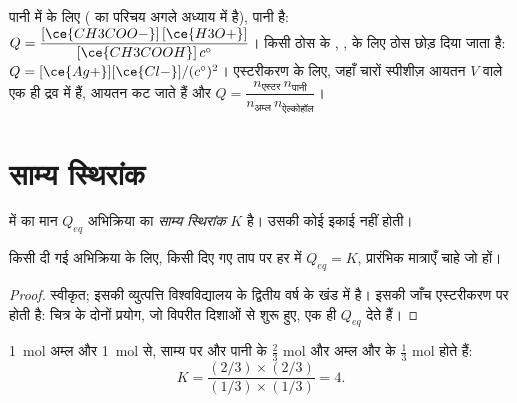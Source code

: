 \begin{example}[भागफल लिखना]\label{ex:g12:equilibrium:quotients}
पानी में  के लिए ( 
का परिचय अगले अध्याय में है), पानी  है:
$Q = \dfrac{[\ce{CH3COO-}]\,[\ce{H3O+}]}{[\ce{CH3COOH}]\,c^\circ}$। किसी ठोस के
, , के लिए ठोस छोड़ दिया जाता है:
$Q = [\ce{Ag+}][\ce{Cl-}]/(c^\circ)^2$। एस्टरीकरण के लिए, जहाँ चारों
स्पीशीज़ आयतन $V$ वाले एक ही द्रव  में हैं, आयतन
कट जाते हैं और $Q = \dfrac{n_{\text{एस्टर}}\, n_{\text{पानी}}}{n_{\text{अम्ल}}\, n_{\text{ऐल्कोहॉल}}}$।
\end{example}

\section{साम्य स्थिरांक}

\begin{definition}[साम्य स्थिरांक]\label{def:g12:equilibrium:constant}
 में  का मान $Q_{eq}$ अभिक्रिया का
\emph{साम्य स्थिरांक} $K$ है।
उसकी कोई इकाई नहीं होती।
\end{definition}

\begin{proposition}[$K$ केवल ताप पर निर्भर करता है]\label{prop:g12:equilibrium:constant}
किसी दी गई अभिक्रिया के लिए, किसी दिए गए ताप पर हर  में $Q_{eq} = K$,
प्रारंभिक मात्राएँ चाहे जो हों।
\end{proposition}

\begin{proof}
स्वीकृत; इसकी व्युत्पत्ति विश्वविद्यालय के द्वितीय वर्ष के खंड में है। इसकी जाँच
एस्टरीकरण पर होती है: चित्र के दोनों प्रयोग, जो विपरीत दिशाओं से शुरू हुए,
एक ही $Q_{eq}$ देते हैं।
\end{proof}

\begin{example}[एस्टरीकरण का $K$]\label{ex:g12:equilibrium:k-ester}
\qty{1}{mol} अम्ल और \qty{1}{mol}  से, साम्य पर
 और पानी के $\frac{2}{3}$ mol और अम्ल और  के $\frac{1}{3}$ mol
होते हैं:
\[
  K = \frac{(2/3)\times(2/3)}{(1/3)\times(1/3)} = 4 .
\]
\end{example}

